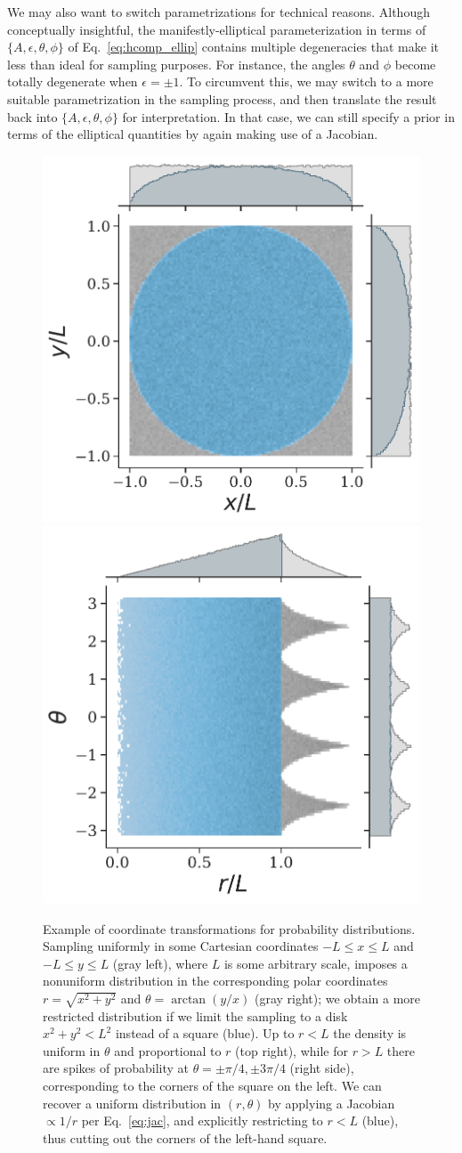 \documentclass[aps,prd,twocolumn,superscriptaddress,preprintnumbers,floatfix,nofootinbib]{revtex4-2}
\newcommand*{\eq}[1]{Eq.~\eqref{eq:#1}}
\begin{document}
We may also want to switch parametrizations for technical reasons.
Although conceptually insightful, the manifestly-elliptical parameterization in terms of $\{A, \epsilon, \theta, \phi\}$ of \eq{hcomp_ellip} contains multiple degeneracies that make it less than ideal for sampling purposes.
For instance, the angles $\theta$ and $\phi$ become totally degenerate when $\epsilon = \pm 1$.
To circumvent this, we may switch to a more suitable parametrization in the sampling process, and then translate the result back into $\{A, \epsilon, \theta, \phi\}$ for interpretation.
In that case, we can still specify a prior in terms of the elliptical quantities by again making use of a Jacobian.

\begin{figure}
\includegraphics[width=0.49\columnwidth]{jac_example_0}
\includegraphics[width=0.49\columnwidth]{jac_example_1}
\caption{Example of coordinate transformations for probability distributions.
Sampling uniformly in some Cartesian coordinates $-L \leq x \leq L$ and $-L \leq y \leq L$ (gray left), where $L$ is some arbitrary scale, imposes a nonuniform distribution in the corresponding polar coordinates $r = \sqrt{x^2 + y^2}$ and $\theta = \arctan(y/x)$ (gray right); we obtain a more restricted distribution if we limit the sampling to a disk $x^2 + y^2 < L^2$ instead of a square (blue). 
Up to $r < L$ the density is uniform in $\theta$ and proportional to $r$ (top right), while for $r>L$ there are spikes of probability at $\theta = \pm \pi/4,\pm 3\pi/4$ (right side), corresponding to the corners of the square on the left.
We can recover a uniform distribution in $(r, \theta)$ by applying a Jacobian $\propto 1/r$ per \eq{jac}, and explicitly restricting to $r< L$ (blue), thus cutting out the corners of the left-hand square.}
\label{fig:jac_example}
\end{figure}
\end{document}
